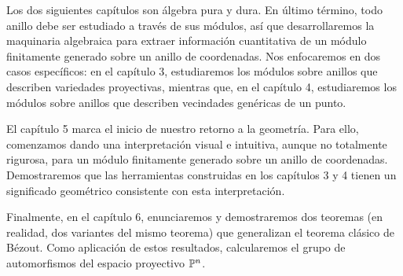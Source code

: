 Los dos siguientes capítulos son álgebra pura y dura. En último término, todo anillo debe ser estudiado a través de sus módulos, así que desarrollaremos la maquinaria algebraica para extraer información cuantitativa de un módulo finitamente generado sobre un anillo de coordenadas. Nos enfocaremos en dos casos específicos: en el capítulo 3, estudiaremos los módulos sobre anillos que describen variedades proyectivas, mientras que, en el capítulo 4, estudiaremos los módulos sobre anillos que describen vecindades genéricas de un punto.

El capítulo 5 marca el inicio de nuestro retorno a la geometría. Para ello, comenzamos dando una interpretación visual e intuitiva, aunque no totalmente rigurosa, para un módulo finitamente generado sobre un anillo de coordenadas. Demostraremos que las herramientas construidas en los capítulos 3 y 4 tienen un significado geométrico consistente con esta interpretación.

Finalmente, en el capítulo 6, enunciaremos y demostraremos dos teoremas (en realidad, dos variantes del mismo teorema) que generalizan el teorema clásico de Bézout. Como aplicación de estos resultados, calcularemos el grupo de automorfismos del espacio proyectivo $\P^n$.
